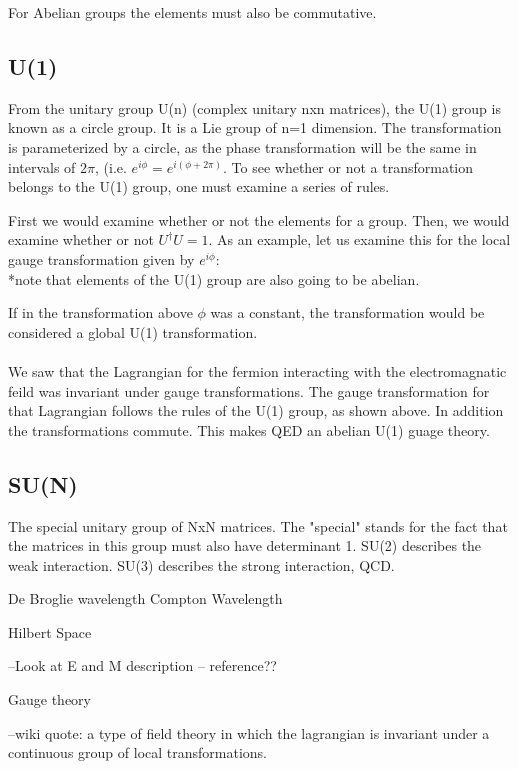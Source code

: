 \documentclass[aps,secnumarabic,nobalancelastpage,amsmath,amssymb,
nofootinbib]{revtex4}
\begin{document}
For Abelian groups the elements must also be commutative.


\subsection{U(1)}

From the unitary group U(n) (complex unitary nxn matrices), the U(1) group is known as a circle group. It is a Lie group of n=1 dimension. The transformation is parameterized by a circle, as the phase transformation will be the same in intervals of $2 \pi$, (i.e. $e^{i \phi} = e^{i (\phi + 2 \pi)}$. To see whether or not a transformation belongs to the U(1) group, one must examine a series of rules.

First we would examine whether or not the elements for a group. Then, we would examine whether or not $U^\dagger U=1$. As an example, let us examine this for the local gauge transformation given by $e^{i \phi}$: \\

*note that elements of the U(1) group are also going to be abelian.

If in the transformation above $\phi$ was a constant, the transformation would be considered a global U(1) transformation.\\
\\
We saw that the Lagrangian for the fermion interacting with the electromagnatic feild was invariant under gauge transformations. The gauge transformation for that Lagrangian follows the rules of the U(1) group, as shown above. In addition the transformations commute. This makes QED an abelian U(1) guage theory. 


\subsection{SU(N)}

The special unitary group of NxN matrices. The "special" stands for the fact that the matrices in this group must also have determinant 1. SU(2) describes the weak interaction. SU(3) describes the strong interaction, QCD.

De Broglie wavelength 
Compton Wavelength

Hilbert Space

--Look at E and M description -- reference??

Gauge theory 

--wiki quote: a type of field theory in which the lagrangian is invariant under a continuous group of local transformations.
\end{document}
